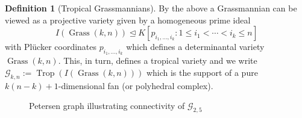 \documentclass[
  paper=a4,
  titlepage,
  bibliography=totoc,
  listof=totoc,
  pagesize=pdftex
]{scrartcl}
\numberwithin{figure}{section}
\numberwithin{equation}{section}
\numberwithin{table}{section}
\let\idealof\trianglelefteq
\DeclareMathOperator{\Trop}{Trop}
\DeclareMathOperator{\Grass}{Grass}
\theoremstyle{definition}
\newtheorem{definition}{Definition}
\numberwithin{definition}{section}
\begin{document}
\begin{definition}[Tropical Grassmannians]
  By the above a Grassmannian can be viewed as a projective variety given by a homogeneous
  prime ideal
  \[
    I(\Grass(k,n)) \idealof K[ p_{i_1, \dots, i_k} : 1\leq i_1 < \cdots < i_k \leq n ]
  \]
  with Plücker coordinates $p_{i_1,\dots,i_k}$ which defines a determinantal variety
  $\Grass(k, n)$. This, in turn, defines a tropical variety and we write $\mathcal G_{k,n}
  := \Trop(I(\Grass(k,n)))$ which is the support of a pure $k(n-k)+1$-dimensional fan (or
  polyhedral complex).
\end{definition}

\begin{figure}[tbhp]
  \centering
  \caption{Petersen graph illustrating connectivity of $\mathcal G_{2,5}$}
  \label{fig:petersen}
\end{figure}
\end{document}
